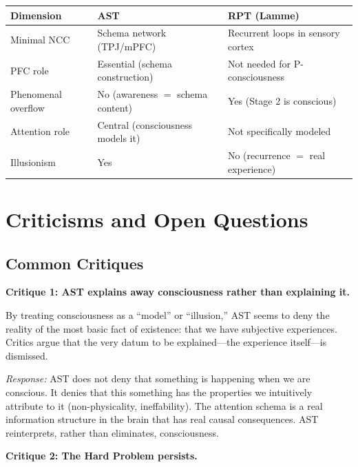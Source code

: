 \documentclass[11pt,a4paper]{report}
\begin{document}
\begin{compbox}
\renewcommand{\arraystretch}{1.4}
\begin{tabular}{>{\raggedright}p{3cm} >{\raggedright}p{5.2cm} >{\raggedright\arraybackslash}p{4.8cm}}
  \toprule
  \textbf{Dimension} & \textbf{AST} & \textbf{RPT (Lamme)} \\
  \midrule
  Minimal NCC & Schema network (TPJ/mPFC) & Recurrent loops in sensory cortex \\
  PFC role & Essential (schema construction) & Not needed for P-consciousness \\
  Phenomenal overflow & No (awareness $=$ schema content) & Yes (Stage 2 is conscious) \\
  Attention role & Central (consciousness models it) & Not specifically modeled \\
  Illusionism & Yes & No (recurrence $=$ real experience) \\
  \bottomrule
\end{tabular}
\end{compbox}


\chapter{Criticisms and Open Questions}

\section{Common Critiques}

\textbf{Critique 1: AST explains away consciousness rather than explaining it.}

By treating consciousness as a ``model'' or ``illusion,'' AST seems to deny the reality of the most basic fact of existence: that we have subjective experiences. Critics argue that the very datum to be explained---the experience itself---is dismissed.

\emph{Response:} AST does not deny that something is happening when we are conscious. It denies that this something has the properties we intuitively attribute to it (non-physicality, ineffability). The attention schema is a real information structure in the brain that has real causal consequences. AST reinterprets, rather than eliminates, consciousness.

\textbf{Critique 2: The Hard Problem persists.}
\end{document}
